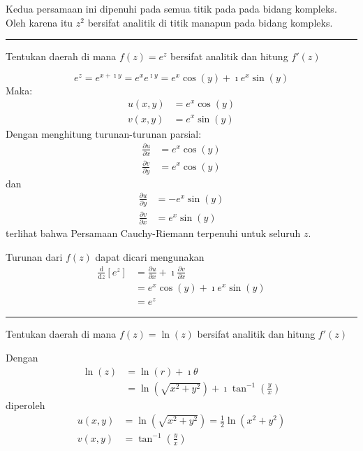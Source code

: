 Kedua persamaan ini dipenuhi pada semua titik pada pada bidang kompleks.
Oleh karena itu $z^{2}$ bersifat analitik di titik manapun pada bidang
kompleks.

\rule[0.5ex]{1\columnwidth}{1pt}

{\color{blue}
Tentukan daerah di mana $f(z)=e^{z}$ bersifat analitik dan hitung
$f'(z)$
}

\begin{equation*}
e^{z}=e^{x+\imath y}=e^{x}e^{\imath y}=e^{x}\cos(y)+\imath e^{x}\sin(y)    
\end{equation*}
Maka:
\begin{align*}
u(x,y) & = e^{x}\cos(y)\\
v(x,y) & = e^{x}\sin(y)
\end{align*}
Dengan menghitung turunan-turunan parsial:
\begin{align*}
\frac{\partial u}{\partial x} &= e^{x}\cos(y) \\
\frac{\partial v}{\partial y} &= e^{x}\cos(y)
\end{align*}
dan
\begin{align*}
\frac{\partial u}{\partial y} & = -e^{x}\sin(y) \\
\frac{\partial v}{\partial x} & = e^{x}\sin(y)
\end{align*}
terlihat bahwa Persamaan Cauchy-Riemann terpenuhi untuk seluruh $z$.

Turunan dari $f(z)$ dapat dicari mengunakan
\begin{align*}
\frac{\mathrm{d}}{\mathrm{d}z}\left[e^{z}\right] & =\frac{\partial u}{\partial x}+\imath\frac{\partial v}{\partial x}\\
 & =e^{x}\cos(y)+\imath e^{x}\sin(y)\\
 & =e^{z}
\end{align*}

\rule[0.5ex]{1\columnwidth}{1pt}

{\color{blue}
Tentukan daerah di mana $f(z)=\ln(z)$ bersifat analitik dan hitung $f'(z)$
}

Dengan
\begin{align*}
\ln(z) & = \ln(r) + \imath\theta\\
 & = \ln\left(\sqrt{x^{2}+y^{2}}\right)+\imath\tan^{-1}\left(\frac{y}{x}\right)
\end{align*}
diperoleh
\begin{align*}
u(x,y) & =\ln\left(\sqrt{x^{2}+y^{2}}\right)=\frac{1}{2}\ln\left(x^{2}+y^{2}\right)\\
v(x,y) & =\tan^{-1}\left(\frac{y}{x}\right)
\end{align*}

